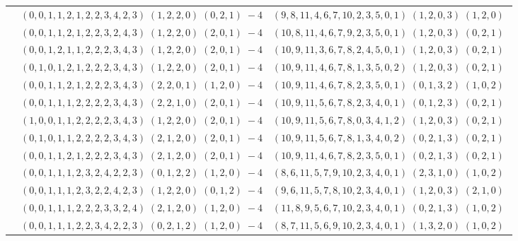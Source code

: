 \documentclass[11pt]{article}
\begin{document}
\begin{longtable}[l]{|c|c|c|}
 \cline{2-3} 
 & $(0 ,0 ,1 ,1 ,2 ,1 ,2 ,2 ,3 ,4 ,2 ,3) \;(1 ,2 ,2 ,0) \;(0 ,2 ,1) \;-4$ & $(9 ,8 ,11 ,4 ,6 ,7 ,10 ,2 ,3 ,5 ,0 ,1) \;(1 ,2 ,0 ,3) \;(1 ,2 ,0) \;$\\ 
 \cline{2-3} 
 & $(0 ,0 ,1 ,1 ,2 ,1 ,2 ,2 ,3 ,2 ,4 ,3) \;(1 ,2 ,2 ,0) \;(2 ,0 ,1) \;-4$ & $(10 ,8 ,11 ,4 ,6 ,7 ,9 ,2 ,3 ,5 ,0 ,1) \;(1 ,2 ,0 ,3) \;(0 ,2 ,1) \;$\\ 
 \cline{2-3} 
 & $(0 ,0 ,1 ,2 ,1 ,1 ,2 ,2 ,2 ,3 ,4 ,3) \;(1 ,2 ,2 ,0) \;(2 ,0 ,1) \;-4$ & $(10 ,9 ,11 ,3 ,6 ,7 ,8 ,2 ,4 ,5 ,0 ,1) \;(1 ,2 ,0 ,3) \;(0 ,2 ,1) \;$\\ 
 \cline{2-3} 
 & $(0 ,1 ,0 ,1 ,2 ,1 ,2 ,2 ,2 ,3 ,4 ,3) \;(1 ,2 ,2 ,0) \;(2 ,0 ,1) \;-4$ & $(10 ,9 ,11 ,4 ,6 ,7 ,8 ,1 ,3 ,5 ,0 ,2) \;(1 ,2 ,0 ,3) \;(0 ,2 ,1) \;$\\ 
 \cline{2-3} 
 & $(0 ,0 ,1 ,1 ,2 ,1 ,2 ,2 ,2 ,3 ,4 ,3) \;(2 ,2 ,0 ,1) \;(1 ,2 ,0) \;-4$ & $(10 ,9 ,11 ,4 ,6 ,7 ,8 ,2 ,3 ,5 ,0 ,1) \;(0 ,1 ,3 ,2) \;(1 ,0 ,2) \;$\\ 
 \cline{2-3} 
 & $(0 ,0 ,1 ,1 ,1 ,2 ,2 ,2 ,2 ,3 ,4 ,3) \;(2 ,2 ,1 ,0) \;(2 ,0 ,1) \;-4$ & $(10 ,9 ,11 ,5 ,6 ,7 ,8 ,2 ,3 ,4 ,0 ,1) \;(0 ,1 ,2 ,3) \;(0 ,2 ,1) \;$\\ 
 \cline{2-3} 
 & $(1 ,0 ,0 ,1 ,1 ,2 ,2 ,2 ,2 ,3 ,4 ,3) \;(1 ,2 ,2 ,0) \;(2 ,0 ,1) \;-4$ & $(10 ,9 ,11 ,5 ,6 ,7 ,8 ,0 ,3 ,4 ,1 ,2) \;(1 ,2 ,0 ,3) \;(0 ,2 ,1) \;$\\ 
 \cline{2-3} 
 & $(0 ,1 ,0 ,1 ,1 ,2 ,2 ,2 ,2 ,3 ,4 ,3) \;(2 ,1 ,2 ,0) \;(2 ,0 ,1) \;-4$ & $(10 ,9 ,11 ,5 ,6 ,7 ,8 ,1 ,3 ,4 ,0 ,2) \;(0 ,2 ,1 ,3) \;(0 ,2 ,1) \;$\\ 
 \cline{2-3} 
 & $(0 ,0 ,1 ,1 ,2 ,1 ,2 ,2 ,2 ,3 ,4 ,3) \;(2 ,1 ,2 ,0) \;(2 ,0 ,1) \;-4$ & $(10 ,9 ,11 ,4 ,6 ,7 ,8 ,2 ,3 ,5 ,0 ,1) \;(0 ,2 ,1 ,3) \;(0 ,2 ,1) \;$\\ 
 \cline{2-3} 
 & $(0 ,0 ,1 ,1 ,1 ,2 ,3 ,2 ,4 ,2 ,2 ,3) \;(0 ,1 ,2 ,2) \;(1 ,2 ,0) \;-4$ & $(8 ,6 ,11 ,5 ,7 ,9 ,10 ,2 ,3 ,4 ,0 ,1) \;(2 ,3 ,1 ,0) \;(1 ,0 ,2) \;$\\ 
 \cline{2-3} 
 & $(0 ,0 ,1 ,1 ,1 ,2 ,3 ,2 ,2 ,4 ,2 ,3) \;(1 ,2 ,2 ,0) \;(0 ,1 ,2) \;-4$ & $(9 ,6 ,11 ,5 ,7 ,8 ,10 ,2 ,3 ,4 ,0 ,1) \;(1 ,2 ,0 ,3) \;(2 ,1 ,0) \;$\\ 
 \cline{2-3} 
 & $(0 ,0 ,1 ,1 ,1 ,2 ,2 ,2 ,3 ,3 ,2 ,4) \;(2 ,1 ,2 ,0) \;(1 ,2 ,0) \;-4$ & $(11 ,8 ,9 ,5 ,6 ,7 ,10 ,2 ,3 ,4 ,0 ,1) \;(0 ,2 ,1 ,3) \;(1 ,0 ,2) \;$\\ 
 \cline{2-3} 
 & $(0 ,0 ,1 ,1 ,1 ,2 ,2 ,3 ,4 ,2 ,2 ,3) \;(0 ,2 ,1 ,2) \;(1 ,2 ,0) \;-4$ & $(8 ,7 ,11 ,5 ,6 ,9 ,10 ,2 ,3 ,4 ,0 ,1) \;(1 ,3 ,2 ,0) \;(1 ,0 ,2) \;$\\ 

\end{longtable}
\end{document}
